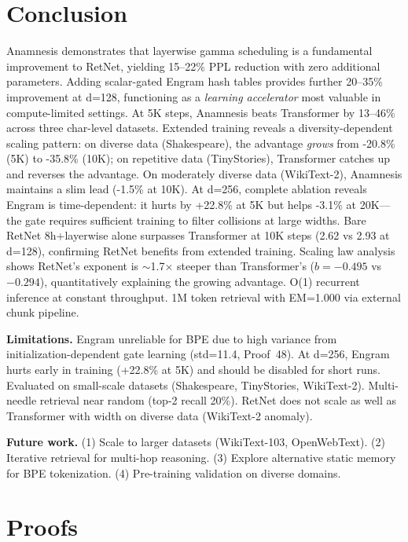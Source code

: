\documentclass[twocolumn]{article}
\begin{document}
\section{Conclusion}

Anamnesis demonstrates that layerwise gamma scheduling is a fundamental improvement to RetNet, yielding 15--22\% PPL reduction with zero additional parameters. Adding scalar-gated Engram hash tables provides further 20--35\% improvement at d=128, functioning as a \emph{learning accelerator} most valuable in compute-limited settings. At 5K steps, Anamnesis beats Transformer by 13--46\% across three char-level datasets. Extended training reveals a diversity-dependent scaling pattern: on diverse data (Shakespeare), the advantage \emph{grows} from -20.8\% (5K) to -35.8\% (10K); on repetitive data (TinyStories), Transformer catches up and reverses the advantage. On moderately diverse data (WikiText-2), Anamnesis maintains a slim lead (-1.5\% at 10K). At d=256, complete ablation reveals Engram is time-dependent: it hurts by +22.8\% at 5K but helps -3.1\% at 20K---the gate requires sufficient training to filter collisions at large widths. Bare RetNet 8h+layerwise alone surpasses Transformer at 10K steps (2.62 vs 2.93 at d=128), confirming RetNet benefits from extended training. Scaling law analysis shows RetNet's exponent is $\sim$1.7$\times$ steeper than Transformer's ($b{=}-0.495$ vs $-0.294$), quantitatively explaining the growing advantage. O(1) recurrent inference at constant throughput. 1M token retrieval with EM=1.000 via external chunk pipeline.

\textbf{Limitations.} Engram unreliable for BPE due to high variance from initialization-dependent gate learning (std=11.4, Proof~48). At d=256, Engram hurts early in training (+22.8\% at 5K) and should be disabled for short runs. Evaluated on small-scale datasets (Shakespeare, TinyStories, WikiText-2). Multi-needle retrieval near random (top-2 recall 20\%). RetNet does not scale as well as Transformer with width on diverse data (WikiText-2 anomaly).

\textbf{Future work.} (1) Scale to larger datasets (WikiText-103, OpenWebText). (2) Iterative retrieval for multi-hop reasoning. (3) Explore alternative static memory for BPE tokenization. (4) Pre-training validation on diverse domains.

\appendix
\section{Proofs}
\end{document}
